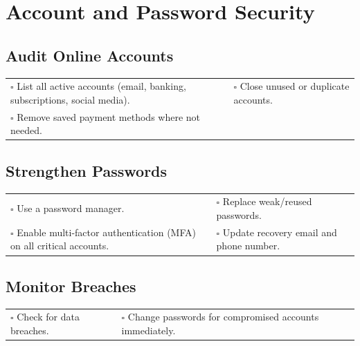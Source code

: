 
\section{Account and Password Security}
\label{sec:account}

\subsection{Audit Online Accounts}

\begin{tabular}{p{9cm} p{8cm}}
$\square$ List all active accounts (email, banking, subscriptions, social media). & $\square$ Close unused or duplicate accounts. \\ 
$\square$ Remove saved payment methods where not needed. & \\ 
\end{tabular}

\subsection{Strengthen Passwords}

\begin{tabular}{p{9cm} p{8cm}}
$\square$ Use a password manager. & $\square$ Replace weak/reused passwords. \\ 
$\square$ Enable multi-factor authentication (MFA) on all critical accounts. & $\square$ Update recovery email and phone number. \\ 
\end{tabular}

\subsection{Monitor Breaches}

\begin{tabular}{p{9cm} p{8cm}}
$\square$ Check for data breaches. & $\square$ Change passwords for compromised accounts immediately. \\ 
\end{tabular}

